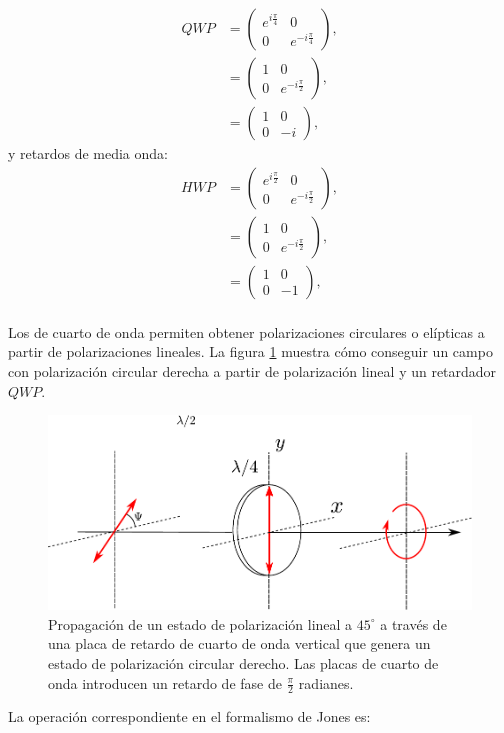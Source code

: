 \begin{align*}
QWP &= \begin{pmatrix} e^{i\frac{\pi}{4}}  &0\\0&e^{-i\frac{\pi}{4}}\end{pmatrix},\\
&=  \begin{pmatrix} 1 &0\\0&e^{-i\frac{\pi}{2}}\end{pmatrix},\\
&=  \begin{pmatrix} 1 &0\\0&-i\end{pmatrix},
\end{align*}
y retardos de
media onda:
\begin{align*}
HWP &= \begin{pmatrix} e^{i\frac{\pi}{2}}  &0\\0&e^{-i\frac{\pi}{2}}\end{pmatrix},\\
&=  \begin{pmatrix} 1 &0\\0&e^{-i\frac{\pi}{2}}\end{pmatrix},\\
&=  \begin{pmatrix} 1 &0\\0&-1\end{pmatrix},\\
\end{align*}


Los de cuarto de onda permiten obtener polarizaciones
circulares o elípticas a partir de polarizaciones lineales. La figura
\ref{fig:qwp_retarder} muestra cómo conseguir un campo con
polarización circular derecha a partir de polarización lineal y un 
retardador $QWP$.
\begin{figure}[h!]
\centering
\includegraphics[scale=.7]{qwp_retarder}
\caption[Generación de estados de polarización circulares]{Propagación de un estado de polarización lineal a
  $45^{\circ}$ a través de una placa de retardo de cuarto de onda
  vertical que genera un estado de polarización circular derecho. Las
placas de cuarto de onda introducen un retardo de fase de
$\frac{\pi}{2}$ radianes.}
\label{fig:qwp_retarder}
\end{figure}
La operación correspondiente en el formalismo de Jones es:

